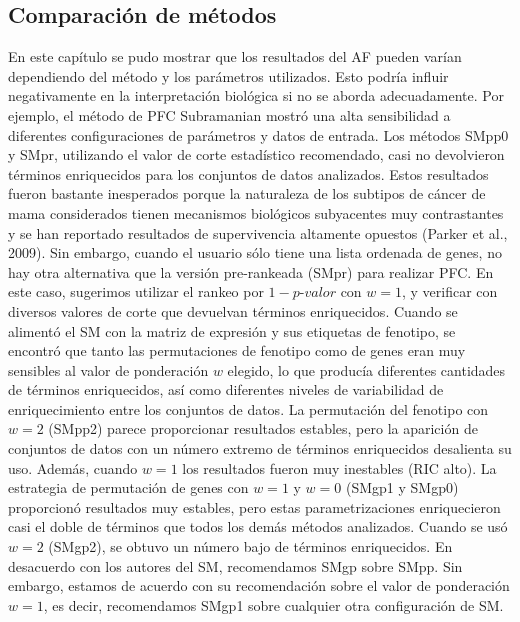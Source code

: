 \documentclass[12pt,twoside]{reedthesis}
\begin{document}
\hypertarget{comparacion-de-metodos}{%
\subsection{Comparación de métodos}\label{comparacion-de-metodos}}

\par

En este capítulo se pudo mostrar que los resultados del AF pueden varían dependiendo del método y los parámetros utilizados. Esto podría influir negativamente en la interpretación biológica si no se aborda adecuadamente. Por ejemplo, el método de PFC Subramanian mostró una alta sensibilidad a diferentes configuraciones de parámetros y datos de entrada. Los métodos SMpp0 y SMpr, utilizando el valor de corte estadístico recomendado, casi no devolvieron términos enriquecidos para los conjuntos de datos analizados. Estos resultados fueron bastante inesperados porque la naturaleza de los subtipos de cáncer de mama considerados tienen mecanismos biológicos subyacentes muy contrastantes y se han reportado resultados de supervivencia altamente opuestos (Parker et al., 2009). Sin embargo, cuando el usuario sólo tiene una lista ordenada de genes, no hay otra alternativa que la versión pre-rankeada (SMpr) para realizar PFC. En este caso, sugerimos utilizar el rankeo por \(1-p\)-\(valor\) con \(w=1\), y verificar con diversos valores de corte que devuelvan términos enriquecidos. Cuando se alimentó el SM con la matriz de expresión y sus etiquetas de fenotipo, se encontró que tanto las permutaciones de fenotipo como de genes eran muy sensibles al valor de ponderación \(w\) elegido, lo que producía diferentes cantidades de términos enriquecidos, así como diferentes niveles de variabilidad de enriquecimiento entre los conjuntos de datos. La permutación del fenotipo con \(w=2\) (SMpp2) parece proporcionar resultados estables, pero la aparición de conjuntos de datos con un número extremo de términos enriquecidos desalienta su uso. Además, cuando \(w=1\) los resultados fueron muy inestables (RIC alto). La estrategia de permutación de genes con \(w=1\) y \(w=0\) (SMgp1 y SMgp0) proporcionó resultados muy estables, pero estas parametrizaciones enriquecieron casi el doble de términos que todos los demás métodos analizados. Cuando se usó \(w=2\) (SMgp2), se obtuvo un número bajo de términos enriquecidos. En desacuerdo con los autores del SM, recomendamos SMgp sobre SMpp. Sin embargo, estamos de acuerdo con su recomendación sobre el valor de ponderación \(w=1\), es decir, recomendamos SMgp1 sobre cualquier otra configuración de SM.
\end{document}
